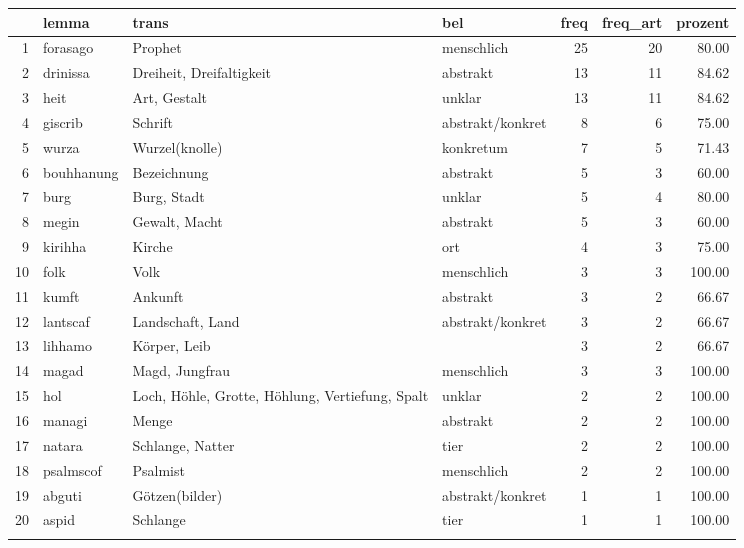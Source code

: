 \begin{tabular}{rlllrrr}
  \lsptoprule
 & lemma & trans & bel & freq & freq\_art & prozent \\ 
  \midrule
1 & forasago & Prophet & menschlich &  25 &  20 & 80.00 \\ 
  2 & drinissa & Dreiheit, Dreifaltigkeit & abstrakt &  13 &  11 & 84.62 \\ 
  3 & heit & Art, Gestalt & unklar &  13 &  11 & 84.62 \\ 
  4 & giscrib & Schrift & abstrakt/konkret &   8 &   6 & 75.00 \\ 
  5 & wurza & Wurzel(knolle) & konkretum &   7 &   5 & 71.43 \\ 
  6 & bouhhanung & Bezeichnung & abstrakt &   5 &   3 & 60.00 \\ 
  7 & burg & Burg, Stadt & unklar &   5 &   4 & 80.00 \\ 
  8 & megin & Gewalt, Macht & abstrakt &   5 &   3 & 60.00 \\ 
  9 & kirihha & Kirche & ort &   4 &   3 & 75.00 \\ 
  10 & folk & Volk & menschlich &   3 &   3 & 100.00 \\ 
  11 & kumft & Ankunft & abstrakt &   3 &   2 & 66.67 \\ 
  12 & lantscaf & Landschaft, Land & abstrakt/konkret &   3 &   2 & 66.67 \\ 
  13 & lihhamo & Körper, Leib &  &   3 &   2 & 66.67 \\ 
  14 & magad & Magd, Jungfrau & menschlich &   3 &   3 & 100.00 \\ 
  15 & hol & Loch, Höhle, Grotte, Höhlung, Vertiefung, Spalt & unklar &   2 &   2 & 100.00 \\ 
  16 & managi & Menge & abstrakt &   2 &   2 & 100.00 \\ 
  17 & natara & Schlange, Natter & tier &   2 &   2 & 100.00 \\ 
  18 & psalmscof & Psalmist & menschlich &   2 &   2 & 100.00 \\ 
  19 & abguti & Götzen(bilder) & abstrakt/konkret &   1 &   1 & 100.00 \\ 
  20 & aspid & Schlange & tier &   1 &   1 & 100.00 \\ 
   \lspbottomrule
\end{tabular}
